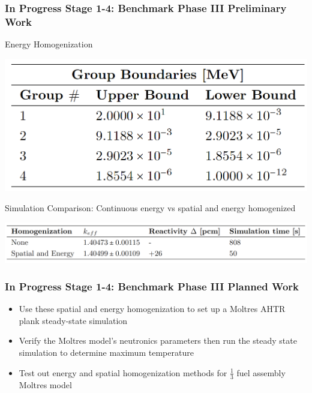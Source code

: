 \begin{frame}
    \frametitle{In Progress Stage 1-4: Benchmark Phase III Preliminary Work}
    \begin{block}{Energy Homogenization}
        \begin{table}[]
            \centering
            \begin{minipage}[c]{0.6\textwidth}
                \centering
                \includegraphics[width=0.9\linewidth]{figures/ahtr-energy-discr.png}
            \end{minipage}\hfill
            \begin{minipage}[c]{0.4\textwidth}
            \caption{4-group energy structures for AHTR geometry 
            derived by \cite{gentry_development_2016}.}
        \end{minipage}
        \end{table}
    \end{block}
    \vspace{-0.3cm}
    \begin{block}{Simulation Comparison: Continuous energy vs spatial 
        and energy homogenized}
        \begin{table}[]
                \centering
                \includegraphics[width=0.9\linewidth]{figures/ahtr-homogenization.png}
            \caption{
                AHTR fuel slab's $k_{eff}$ for case with continuous energy and 
                space and case with spatial and energy homogenization.}
        \end{table}
    \end{block}
\end{frame}

\begin{frame}
    \frametitle{In Progress Stage 1-4: Benchmark Phase III Planned Work}
    \begin{itemize}
        \item Use these spatial and energy homogenization to set up a 
        Moltres AHTR plank steady-state simulation 
        \item Verify the Moltres model's neutronics parameters then run 
        the steady state simulation to determine maximum temperature 
        \item Test out energy and spatial homogenization methods for $\frac{1}{3}$
        fuel assembly Moltres model 
    \end{itemize}
\end{frame}